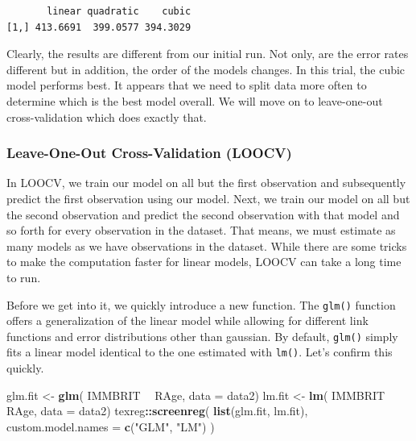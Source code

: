 \documentclass[]{article}
\newenvironment{Shaded}{\begin{snugshade}}{\end{snugshade}}
\newcommand{\DataTypeTok}[1]{\textcolor[rgb]{0.13,0.29,0.53}{#1}}
\newcommand{\KeywordTok}[1]{\textcolor[rgb]{0.13,0.29,0.53}{\textbf{#1}}}
\newcommand{\NormalTok}[1]{#1}
\newcommand{\OperatorTok}[1]{\textcolor[rgb]{0.81,0.36,0.00}{\textbf{#1}}}
\newcommand{\StringTok}[1]{\textcolor[rgb]{0.31,0.60,0.02}{#1}}
\begin{document}
\begin{verbatim}
       linear quadratic    cubic
[1,] 413.6691  399.0577 394.3029
\end{verbatim}

Clearly, the results are different from our initial run. Not only, are the error rates different but in addition, the order of the models changes. In this trial, the cubic model performs best. It appears that we need to split data more often to determine which is the best model overall. We will move on to leave-one-out cross-validation which does exactly that.

\hypertarget{leave-one-out-cross-validation-loocv}{%
\subsubsection{Leave-One-Out Cross-Validation (LOOCV)}\label{leave-one-out-cross-validation-loocv}}

In LOOCV, we train our model on all but the first observation and subsequently predict the first observation using our model. Next, we train our model on all but the second observation and predict the second observation with that model and so forth for every observation in the dataset. That means, we must estimate as many models as we have observations in the dataset. While there are some tricks to make the computation faster for linear models, LOOCV can take a long time to run.

Before we get into it, we quickly introduce a new function. The \texttt{glm()} function offers a generalization of the linear model while allowing for different link functions and error distributions other than gaussian. By default, \texttt{glm()} simply fits a linear model identical to the one estimated with \texttt{lm()}. Let's confirm this quickly.

\begin{Shaded}
\begin{Highlighting}[]
\NormalTok{glm.fit <-}\StringTok{ }\KeywordTok{glm}\NormalTok{( IMMBRIT }\OperatorTok{~}\StringTok{ }\NormalTok{RAge, }\DataTypeTok{data =}\NormalTok{ data2)}
\NormalTok{lm.fit <-}\StringTok{ }\KeywordTok{lm}\NormalTok{( IMMBRIT }\OperatorTok{~}\StringTok{ }\NormalTok{RAge, }\DataTypeTok{data =}\NormalTok{ data2)}
\NormalTok{texreg}\OperatorTok{::}\KeywordTok{screenreg}\NormalTok{( }\KeywordTok{list}\NormalTok{(glm.fit, lm.fit), }\DataTypeTok{custom.model.names =} \KeywordTok{c}\NormalTok{(}\StringTok{"GLM"}\NormalTok{, }\StringTok{"LM"}\NormalTok{) )}
\end{Highlighting}
\end{Shaded}
\end{document}
